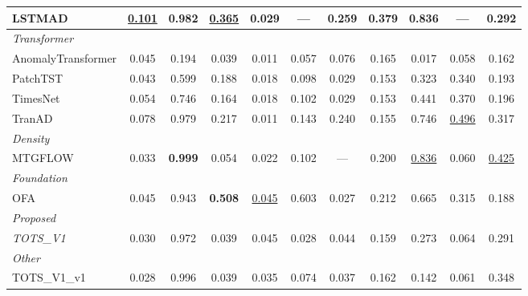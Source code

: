 \begin{table}[t]
\begin{tabular}{lcccccccccc}
LSTMAD & \underline{0.101} & 0.982 & \underline{0.365} & 0.029 & --- & \textbf{0.259} & \textbf{0.379} & 0.836 & --- & 0.292 \\
\midrule
\multicolumn{11}{l}{\textit{Transformer}} \\
AnomalyTransformer & 0.045 & 0.194 & 0.039 & 0.011 & 0.057 & 0.076 & 0.165 & 0.017 & 0.058 & 0.162 \\
PatchTST & 0.043 & 0.599 & 0.188 & 0.018 & 0.098 & 0.029 & 0.153 & 0.323 & 0.340 & 0.193 \\
TimesNet & 0.054 & 0.746 & 0.164 & 0.018 & 0.102 & 0.029 & 0.153 & 0.441 & 0.370 & 0.196 \\
TranAD & 0.078 & 0.979 & 0.217 & 0.011 & 0.143 & 0.240 & 0.155 & 0.746 & \underline{0.496} & 0.317 \\
\midrule
\multicolumn{11}{l}{\textit{Density}} \\
MTGFLOW & 0.033 & \textbf{0.999} & 0.054 & 0.022 & 0.102 & --- & 0.200 & \underline{0.836} & 0.060 & \underline{0.425} \\
\midrule
\multicolumn{11}{l}{\textit{Foundation}} \\
OFA & 0.045 & 0.943 & \textbf{0.508} & \underline{0.045} & 0.603 & 0.027 & 0.212 & 0.665 & 0.315 & 0.188 \\
\midrule
\multicolumn{11}{l}{\textit{Proposed}} \\
\textit{TOTS\_V1} & 0.030 & 0.972 & 0.039 & 0.045 & 0.028 & 0.044 & 0.159 & 0.273 & 0.064 & 0.291 \\
\midrule
\multicolumn{11}{l}{\textit{Other}} \\
TOTS\_V1\_v1 & 0.028 & 0.996 & 0.039 & 0.035 & 0.074 & 0.037 & 0.162 & 0.142 & 0.061 & 0.348 \\
\bottomrule
\end{tabular}
\end{table}
